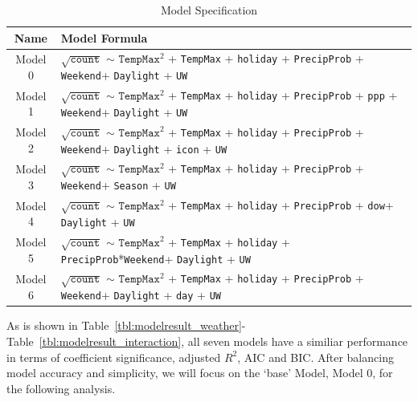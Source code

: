 \documentclass [11pt, proquest] {uwthesis}[2015/03/03]
\begin{document}
\begin{table}
\caption{Model Specification} 
  \label{tbl:model_spec} 
\small
\begin{tabular}{ c | l } 
\hline 
  Name & Model Formula \\ 
\hline
  Model 0 & $\sqrt{\texttt{count}}$ $\sim$ $\texttt{TempMax}^2$  + \texttt{TempMax} + \texttt{holiday} + \texttt{PrecipProb} + \texttt{Weekend}+ \texttt{Daylight} + \texttt{UW}  \\ 
  Model 1 & $\sqrt{\texttt{count}}$ $\sim$ $\texttt{TempMax}^2$  + \texttt{TempMax} + \texttt{holiday} + \texttt{PrecipProb} + \texttt{ppp} + \texttt{Weekend}+ \texttt{Daylight} + \texttt{UW} \\ 
  Model 2 & $\sqrt{\texttt{count}}$ $\sim$ $\texttt{TempMax}^2$  + \texttt{TempMax} + \texttt{holiday} + \texttt{PrecipProb} + \texttt{Weekend}+ \texttt{Daylight} + \texttt{icon} + \texttt{UW} \\ 
  Model 3 & $\sqrt{\texttt{count}}$ $\sim$ $\texttt{TempMax}^2$ + \texttt{TempMax} + \texttt{holiday} + \texttt{PrecipProb} + \texttt{Weekend}+ \texttt{Season} + \texttt{UW} \\
  Model 4 &  $\sqrt{\texttt{count}}$ $\sim$ $\texttt{TempMax}^2$  + \texttt{TempMax} + \texttt{holiday} + \texttt{PrecipProb} + \texttt{dow}+ \texttt{Daylight} + \texttt{UW} \\
  Model 5 &  $\sqrt{\texttt{count}}$ $\sim$ $\texttt{TempMax}^2$  + \texttt{TempMax} + \texttt{holiday} + \texttt{PrecipProb}*\texttt{Weekend}+ \texttt{Daylight} + \texttt{UW} \\
   Model 6 &  $\sqrt{\texttt{count}}$ $\sim$ $\texttt{TempMax}^2$  + \texttt{TempMax} + \texttt{holiday} + \texttt{PrecipProb} + \texttt{Weekend}+ \texttt{Daylight} + \texttt{day} + \texttt{UW}\\
\hline 
\end{tabular} 
\end{table} 

As is shown in Table~\ref{tbl:modelresult_weather}-Table~\ref{tbl:modelresult_interaction}, all seven models have a similiar performance in terms of coefficient significance, adjusted $R^2$, AIC and BIC. After balancing model accuracy and simplicity, we will focus on the `base' Model, Model 0, for the following analysis. 
\end{document}

